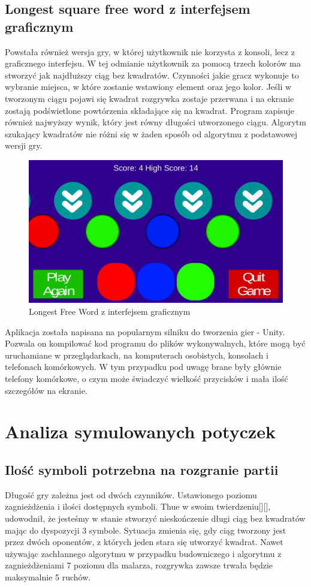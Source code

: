 \documentclass[document]{xmgr}
\begin{document}
\section{Longest square free word z interfejsem graficznym}
Powstała również wersja gry, w której użytkownik nie korzysta z konsoli, lecz z graficznego interfejsu. W tej odmianie użytkownik za pomocą trzech kolorów ma stworzyć jak najdłuższy ciąg bez kwadratów. Czynności jakie gracz wykonuje to wybranie miejsca, w które zostanie wstawiony element oraz jego kolor. Jeśli w tworzonym ciągu pojawi się kwadrat rozgrywka zostaje przerwana i na ekranie zostają podświetlone powtórzenia składające się na kwadrat. Program zapisuje również najwyższy wynik, który jest równy długości utworzonego ciągu. Algorytm szukający kwadratów nie różni się w żaden sposób od algorytmu z podstawowej wersji gry.

\begin{figure}[H]
    \centering
    \includegraphics[scale = 0.2]{images/thueMobile}
    \caption{Longest Free Word z interfejsem graficznym}
    \label{fig:thueMobile}
\end{figure}

Aplikacja została napisana na popularnym silniku do tworzenia gier - Unity. Pozwala on kompilować kod programu do plików wykonywalnych, które mogą być uruchamiane w przeglądarkach, na komputerach osobistych, konsolach i telefonach komórkowych. W tym przypadku pod uwagę brane były głównie telefony komórkowe, o czym może świadczyć wielkość przycisków i mała ilość szczegółów na ekranie.


\chapter{Analiza symulowanych potyczek} 

\section{Ilość symboli potrzebna na rozgranie partii}
Długość gry zależna jest od dwóch czynników. Ustawionego poziomu zagnieżdżenia i ilości dostępnych symboli. Thue w swoim twierdzeniu[][], udowodnił, że jesteśmy w stanie stworzyć nieskończenie długi ciąg bez kwadratów mając do dyspozycji 3 symbole. Sytuacja zmienia się, gdy ciąg tworzony jest przez dwóch oponentów, z których jeden stara się utworzyć kwadrat. Nawet używając zachłannego algorytmu w przypadku budowniczego i algorytmu z zagnieżdżeniami 7 poziomu dla malarza, rozgrywka zawsze trwała będzie maksymalnie 5 ruchów. 
\end{document}
